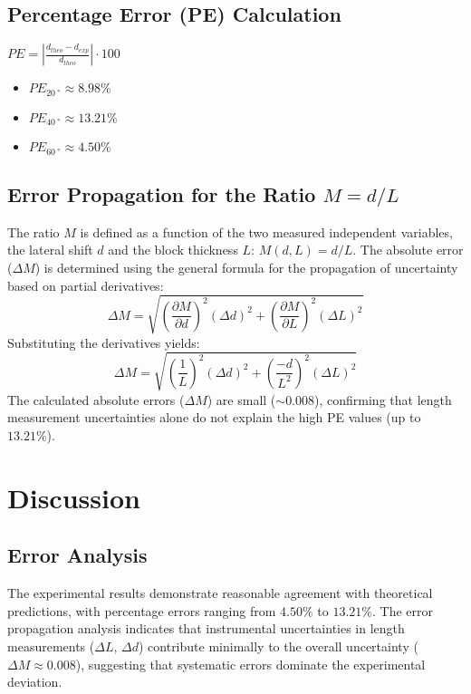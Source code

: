\documentclass[12pt, a4paper]{article}
\begin{document}
\subsection{Percentage Error (PE) Calculation}
$PE = \left|\frac{d_{theo}-d_{exp}}{d_{theo}}\right|\cdot100$
\begin{itemize}
    \item $PE_{\SI{20}{\degree}} \approx \mathbf{8.98\%}$
    \item $PE_{\SI{40}{\degree}} \approx \mathbf{13.21\%}$
    \item $PE_{\SI{60}{\degree}} \approx \mathbf{4.50\%}$
\end{itemize}

\subsection{Error Propagation for the Ratio $M = d/L$}
The ratio $M$ is defined as a function of the two measured independent variables, the lateral shift $d$ and the block thickness $L$: $M(d,L) = d/L$. The absolute error ($\Delta M$) is determined using the general formula for the propagation of uncertainty based on partial derivatives:
$$\Delta M=\sqrt{\left(\frac{\partial M}{\partial d}\right)^{2}\left(\Delta d\right)^{2}+\left(\frac{\partial M}{\partial L}\right)^{2}\left(\Delta L\right)^{2}}$$
Substituting the derivatives yields:
$$\Delta M=\sqrt{\left(\frac{1}{L}\right)^{2}\left(\Delta d\right)^{2}+\left(\frac{-d}{L^{2}}\right)^{2}\left(\Delta L\right)^{2}}$$
The calculated absolute errors ($\Delta M$) are small ($\sim 0.008$), confirming that length measurement uncertainties alone do not explain the high PE values (up to $13.21\%$).

\section{Discussion}

\subsection{Error Analysis}

The experimental results demonstrate reasonable agreement with theoretical predictions, with percentage errors ranging from $4.50\%$ to $13.21\%$. The error propagation analysis indicates that instrumental uncertainties in length measurements ($\Delta L$, $\Delta d$) contribute minimally to the overall uncertainty ($\Delta M \approx 0.008$), suggesting that systematic errors dominate the experimental deviation.
\end{document}
